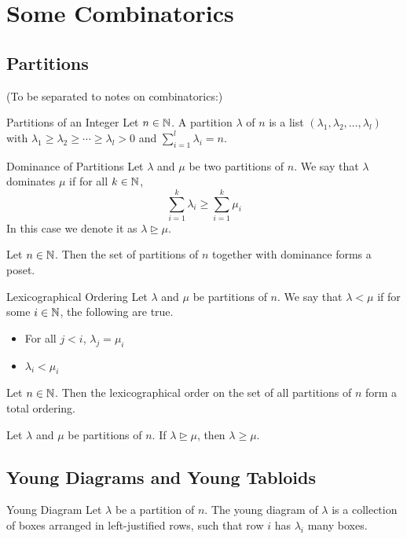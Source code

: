\documentclass[a4paper]{article}
\begin{document}
\pagebreak
\section{Some Combinatorics}
\subsection{Partitions}
(To be separated to notes on combinatorics:)
\begin{defn}{Partitions of an Integer}{} Let $n\in\mathbb{N}$. A partition $\lambda$ of $n$ is a list $(\lambda_1,\lambda_2,\dots,\lambda_l)$ with $\lambda_1\geq\lambda_2\geq\cdots\geq\lambda_l>0$ and $\sum_{i=1}^l\lambda_i=n$. 
\end{defn}

\begin{defn}{Dominance of Partitions}{} Let $\lambda$ and $\mu$ be two partitions of $n$. We say that $\lambda$ dominates $\mu$ if for all $k\in\mathbb{N}$, $$\sum_{i=1}^k\lambda_i\geq\sum_{i=1}^k\mu_i$$ In this case we denote it as $\lambda\trianglerighteq\mu$. 
\end{defn}

\begin{lmm}{}{} Let $n\in\mathbb{N}$. Then the set of partitions of $n$ together with dominance forms a poset. 
\end{lmm}

\begin{defn}{Lexicographical Ordering}{} Let $\lambda$ and $\mu$ be partitions of $n$. We say that $\lambda<\mu$ if for some $i\in\mathbb{N}$, the following are true. 
\begin{itemize}
\item For all $j<i$, $\lambda_j=\mu_i$
\item $\lambda_i<\mu_i$
\end{itemize}
\end{defn}

\begin{lmm}{}{} Let $n\in\mathbb{N}$. Then the lexicographical order on the set of all partitions of $n$ form a total ordering. 
\end{lmm}

\begin{prp}{}{} Let $\lambda$ and $\mu$ be partitions of $n$. If $\lambda\trianglerighteq\mu$, then $\lambda\geq\mu$. 
\end{prp}

\subsection{Young Diagrams and Young Tabloids}
\begin{defn}{Young Diagram}{} Let $\lambda$ be a partition of $n$. The young diagram of $\lambda$ is a collection of boxes arranged in left-justified rows, such that row $i$ has $\lambda_i$ many boxes. 
\end{defn}
\end{document}
